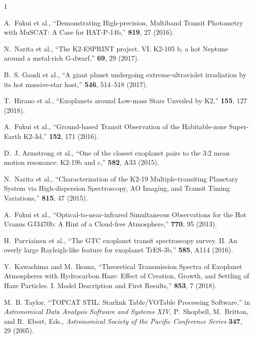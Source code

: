 \documentclass[a4paper,12pt]{spieman}  %
\begin{document}
\begin{spacing}{1}
\begin{thebibliography}{}
A.~{Fukui} et al., ``{Demonstrating
  High-precision, Multiband Transit Photometry with MuSCAT: A Case for
  HAT-P-14b},'' {\em \apj} {\bf 819}, 27  (2016).

N.~{Narita} et al., ``{The K2-ESPRINT project. VI. K2-105 b, a
  hot Neptune around a metal-rich G-dwarf},'' {\em \pasj} {\bf 69}, 29  (2017).

B.~S. {Gaudi} et al., ``{A giant planet undergoing extreme-ultraviolet irradiation
  by its hot massive-star host},'' {\em \nat} {\bf 546}, 514--518  (2017).

T.~{Hirano} et al., ``{Exoplanets around Low-mass
  Stars Unveiled by K2},'' {\em \aj} {\bf 155}, 127  (2018).

A.~{Fukui} et al., ``{Ground-based Transit Observation of the Habitable-zone
  Super-Earth K2-3d},'' {\em \aj} {\bf 152}, 171  (2016).

D.~J. {Armstrong} et al., ``{One of
  the closest exoplanet pairs to the 3:2 mean motion resonance: K2-19b and
  c},'' {\em \aap} {\bf 582}, A33  (2015).

N.~{Narita} et al., ``{Characterization of the
  K2-19 Multiple-transiting Planetary System via High-dispersion Spectroscopy,
  AO Imaging, and Transit Timing Variations},'' {\em \apj} {\bf 815}, 47
  (2015).

A.~{Fukui} et al., ``{Optical-to-near-infrared
  Simultaneous Observations for the Hot Uranus GJ3470b: A Hint of a Cloud-free
  Atmosphere},'' {\em \apj} {\bf 770}, 95  (2013).

H.~{Parviainen} et al., ``{The GTC exoplanet transit spectroscopy
  survey. II. An overly large Rayleigh-like feature for exoplanet TrES-3b},''
  {\em \aap} {\bf 585}, A114  (2016).

Y.~{Kawashima} and M.~{Ikoma}, ``{Theoretical Transmission Spectra of Exoplanet
  Atmospheres with Hydrocarbon Haze: Effect of Creation, Growth, and Settling
  of Haze Particles. I. Model Description and First Results},'' {\em \apj} {\bf
  853}, 7  (2018).

M.~B. {Taylor}, ``{TOPCAT STIL: Starlink Table/VOTable Processing Software},''
  in {\em Astronomical Data Analysis Software and Systems XIV},  P.~{Shopbell},
  M.~{Britton}, and R.~{Ebert}, Eds., {\em Astronomical Society of the Pacific
  Conference Series} {\bf 347}, 29  (2005).


\end{thebibliography}
\end{spacing}
\end{document}
